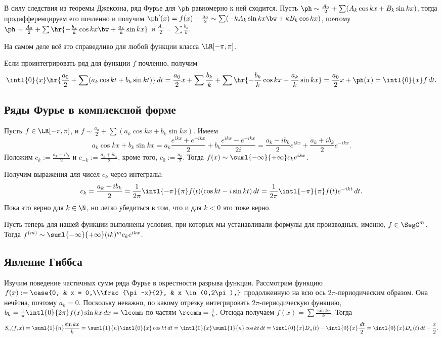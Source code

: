 \documentclass[a4paper]{article}
\newcommand{\intlox}{\intl{0}{x}}
\newcommand{\intlpp}{\intl{-\pi}{\pi}}
\newcommand{\frpi}{\frac{1}{\pi}}
\begin{document}
В силу следствия из теоремы Джексона, ряд Фурье для $\ph$ равномерно к ней сходится. Пусть
$\ph \sim \frac{A_0}{2} + \sum(A_k\cos kx + B_k\sin kx)$,
тогда продифференцируем его почленно и получим
$\ph'(x) = f(x)-\frac{a_0}{2} \sim \sum (-kA_k\sin kx \bw+ kB_k\cos kx)$, поэтому
$\ph \sim \frac{A_0}{2} + \sum\hr{-\frac{b_k}{k}\cos kx \bw+ \frac{a_k}{k}\sin kx}$ и $\frac{A_0}{2} = \sum \frac{b_k}{k}$.

\begin{note}
На самом деле всё это справедливо для любой функции класса $\LR[-\pi,\pi]$.
\end{note}

Если проинтегрировать ряд для функции $f$ почленно, получим
$$\intlox\hr{\frac{a_0}{2}+\sum(a_k\cos
kt + b_k\sin kt)}\,d t=\frac{a_0}{2}x+\sum\frac{b_k}{k} + \sum\hr{-\frac{b_k}{k}\cos kx +
\frac{a_k}{k}\sin kx}= \frac{a_0}{2}x+\ph(x) = \intlox f \,d t.$$

\subsection{Ряды Фурье в комплексной форме}

Пусть $f \in\LR[-\pi,\pi]$, и $f \sim \frac{a_0}{2} + \sum (a_k\cos kx + b_k \sin kx)$.
Имеем $$a_k\cos kx + b_k\sin kx = a_k\frac{e^{ikx}+e^{-ikx}}{2} + b_k\frac{e^{ikx} -e^{-ikx}}{2i} =
\frac{a_k - ib_k}{2}e^{ikx} + \frac{a_k + ib_k}{2}e^{-ikx}.$$
Положим $c_k := \frac{a_k - ib_k}{2}$ и $c_{-k} := \frac{a_k + ib_k}{2}$, кроме того, $c_0 := \frac{a_0}{2}$.
Тогда $f(x) \sim \suml{-\infty}{+\infty}c_ke^{ikx}$.

Получим выражения для чисел $c_k$ через интегралы: $$c_k = \frac{a_k -
ib_k}{2}=\frac{1}{2\pi}\intlpp f(t)(\cos kt -i\sin kt)\,d t = \frac{1}{2\pi}\intlpp
f(t)e^{-ikt}\,d t.$$
Пока это верно для $k \in \N$, но легко убедиться в том, что и для $k < 0$ это
тоже верно.

Пусть теперь для нашей функции выполнены условия, при которых мы устанавливали формулы для
производных, именно, $f \in\SegC^m$. Тогда
$f^{(m)} \sim \suml{-\infty}{+\infty}(ik)^mc_ke^{ikx}$.

\subsection{Явление Гиббса}

Изучим поведение частичных сумм ряда Фурье в окрестности разрыва функции. Рассмотрим функцию $f(x)
:= \case{0, & x = 0,\\\frac{\pi-x}{2}, & x \in (0,2\pi),}$ продолженную на всю ось $2\pi$-периодическим
образом. Она нечётна, поэтому $a_k = 0$. Поскольку неважно, по какому отрезку интегрировать
$2\pi$-периодическую функцию, $b_k = \frpi \intl{0}{2\pi}f(x)\sin kx \,d x = \lcomm$ по частям
$\rcomm = \frac{1}{k}$. Отсюда получаем $f(x) = \sum \frac{\sin kx}{k}$. Тогда $$S_n(f,x) =
\suml{1}{n}\frac{\sin kx}{k} = \suml{1}{n}\intlox\cos kt\,d t = \intlox \suml{1}{n}\cos kt \,d t
= \intlox D_n(t) - \intlox \frac{\,d t}{2} = \intlox D_n(t)\,d t - \frac{x}{2}.$$
\end{document}
